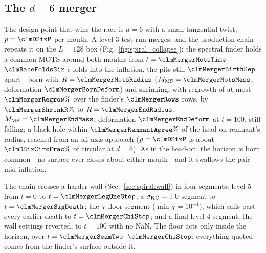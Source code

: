 \documentclass[twocolumn,floatfix,aps,prd,superscriptaddress,nofootinbib]{revtex4-2}
\begin{document}
\subsection{The $d=6$ merger}
\label{sec:spiral:inspiral}

The design point that wins the race is $d=6$ with a small tangential twist, $p=\clmDSixP$ per mouth. A level-3 test run merges, and the production chain repeats it on the $L=128$ box (Fig.~\ref{fig:spiral_collapse}): the spectral finder holds a common MOTS around both mouths from $t=\clmMergerMotsTime$---$\clmRaceFoldsSix$ e-folds into the inflation, the pits still $\clmMergerBirthSep$ apart---born with $R=\clmMergerMotsRadius$ ($M_{\rm MS}=\clmMergerMotsMass$, deformation $\clmMergerBornDeform$) and shrinking, with regrowth of at most $\clmMergerRegrow\%$ over the finder's $\clmMergerRows$ rows, by $\clmMergerShrinkR\%$ to $R=\clmMergerEndRadius$, $M_{\rm MS}=\clmMergerEndMass$, deformation $\clmMergerEndDeform$ at $t=100$, still falling: a black hole within $\clmMergerRemnantAgree\%$ of the head-on remnant's radius, reached from an off-axis approach ($p=\clmDSixP$ is about $\clmDSixCircFrac\%$ of circular at $d=6$). As in the head-on, the horizon is born common---no surface ever closes about either mouth---and it swallows the pair mid-inflation.

The chain crosses a harder wall (Sec.~\ref{sec:spiral:wall}) in four segments: level 5 from $t=0$ to $t=\clmMergerLegOneStop$; a $\sigma_{\rm KO}=1.0$ segment to $t=\clmMergerSigDeath$; the $\chi$-floor segment ($\min\chi=10^{-4}$), which sails past every earlier death to $t=\clmMergerChiStop$; and a final level-4 segment, the wall settings reverted, to $t=100$ with no NaN. The floor acts only inside the horizon, over $t=\clmMergerSeamTwo$--$\clmMergerChiStop$; everything quoted comes from the finder's surface outside it.
\end{document}
